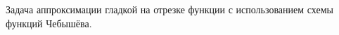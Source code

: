 \documentclass[__main__.tex]{subfiles}
\begin{document}
Задача аппроксимации гладкой на отрезке функции с использованием схемы функций Чебышёва.
\end{document}
